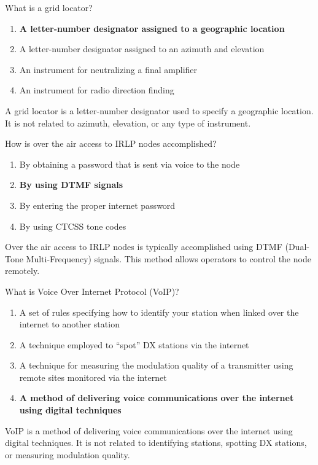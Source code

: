 
\begin{tcolorbox}[colback=gray!10!white,colframe=black!75!black,title={T8C05}]
    What is a grid locator?
    \begin{enumerate}[label=\Alph*),noitemsep]
        \item \textbf{A letter-number designator assigned to a geographic location}
        \item A letter-number designator assigned to an azimuth and elevation
        \item An instrument for neutralizing a final amplifier
        \item An instrument for radio direction finding
    \end{enumerate}
\end{tcolorbox}
A grid locator is a letter-number designator used to specify a geographic location. It is not related to azimuth, elevation, or any type of instrument.


\begin{tcolorbox}[colback=gray!10!white,colframe=black!75!black,title={T8C06}]
    How is over the air access to IRLP nodes accomplished?
    \begin{enumerate}[label=\Alph*),noitemsep]
        \item By obtaining a password that is sent via voice to the node
        \item \textbf{By using DTMF signals}
        \item By entering the proper internet password
        \item By using CTCSS tone codes
    \end{enumerate}
\end{tcolorbox}
Over the air access to IRLP nodes is typically accomplished using DTMF (Dual-Tone Multi-Frequency) signals. This method allows operators to control the node remotely.


\begin{tcolorbox}[colback=gray!10!white,colframe=black!75!black,title={T8C07}]
    What is Voice Over Internet Protocol (VoIP)?
    \begin{enumerate}[label=\Alph*),noitemsep]
        \item A set of rules specifying how to identify your station when linked over the internet to another station
        \item A technique employed to “spot” DX stations via the internet
        \item A technique for measuring the modulation quality of a transmitter using remote sites monitored via the internet
        \item \textbf{A method of delivering voice communications over the internet using digital techniques}
    \end{enumerate}
\end{tcolorbox}
VoIP is a method of delivering voice communications over the internet using digital techniques. It is not related to identifying stations, spotting DX stations, or measuring modulation quality.

